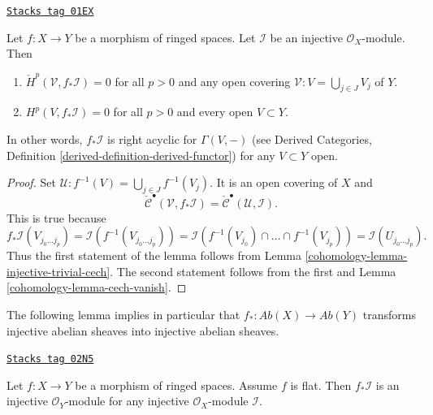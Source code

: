 \begin{lemma}
\label{cohomology-lemma-pushforward-injective}
\href{https://stacks.math.columbia.edu/tag/01EX}{\texttt{Stacks tag 01EX}}

Let $f : X \to Y$ be a morphism of ringed spaces.
Let $\mathcal{I}$ be an injective $\mathcal{O}_X$-module.
Then
\begin{enumerate}
\item $\check{H}^p(\mathcal{V}, f_*\mathcal{I}) = 0$
for all $p > 0$ and any open covering
$\mathcal{V} : V = \bigcup_{j \in J} V_j$ of $Y$.
\item $H^p(V, f_*\mathcal{I}) = 0$ for all $p > 0$ and
every open $V \subset Y$.
\end{enumerate}
In other words, $f_*\mathcal{I}$ is right acyclic for $\Gamma(V, -)$
(see
Derived Categories, Definition \ref{derived-definition-derived-functor})
for any $V \subset Y$ open.
\end{lemma}

\begin{proof}

Set $\mathcal{U} : f^{-1}(V) = \bigcup_{j \in J} f^{-1}(V_j)$.
It is an open covering of $X$ and
$$
\check{\mathcal{C}}^\bullet(\mathcal{V}, f_*\mathcal{I}) =
\check{\mathcal{C}}^\bullet(\mathcal{U}, \mathcal{I}).
$$
This is true because
$$
f_*\mathcal{I}(V_{j_0 \ldots j_p})
= \mathcal{I}(f^{-1}(V_{j_0 \ldots j_p})) =
\mathcal{I}(f^{-1}(V_{j_0}) \cap \ldots \cap f^{-1}(V_{j_p}))
= \mathcal{I}(U_{j_0 \ldots j_p}).
$$
Thus the first statement of the lemma follows from
Lemma \ref{cohomology-lemma-injective-trivial-cech}. The second statement
follows from the first and Lemma \ref{cohomology-lemma-cech-vanish}.
\end{proof}

The following lemma implies in particular that
$f_* : \textit{Ab}(X) \to \textit{Ab}(Y)$ transforms injective
abelian sheaves into injective abelian sheaves.

\begin{lemma}
\label{cohomology-lemma-pushforward-injective-flat}
\href{https://stacks.math.columbia.edu/tag/02N5}{\texttt{Stacks tag 02N5}}

Let $f : X \to Y$ be a morphism of ringed spaces.
Assume $f$ is flat.
Then $f_*\mathcal{I}$ is an injective $\mathcal{O}_Y$-module
for any injective $\mathcal{O}_X$-module $\mathcal{I}$.
\end{lemma}

